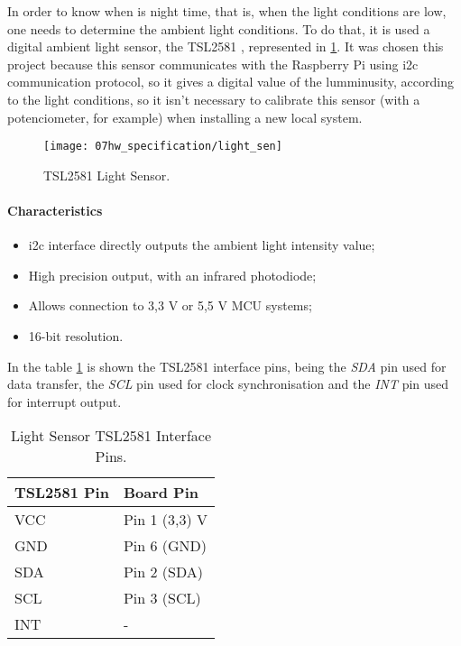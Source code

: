 In order to know when is night time, that is, when the light conditions are low, one needs to determine the ambient light conditions. To do that, it is used a digital ambient light sensor, the TSL2581 \cite{light_sensor}, represented in \ref{fig:light_sen}. It was chosen this project because this sensor communicates with the Raspberry Pi using \ac{i2c} communication protocol, so it gives a digital value of the lumminusity, according to the light conditions, so it isn't necessary to calibrate this sensor (with a potenciometer, for example) when installing a new local system.

\begin{figure}[ht]
	\centering
	\texttt{[image: 07hw\_specification/light\_sen]}
	\caption{TSL2581 Light Sensor.}
	\label{fig:light_sen}
\end{figure}

\paragraph*{Characteristics}
\begin{itemize}
	\item \ac{i2c} interface directly outputs the ambient light intensity value;
	\item High precision output, with an infrared photodiode;
	\item Allows connection to 3,3 V or 5,5 V MCU systems;
	\item 16-bit resolution.
\end{itemize}

In the table \ref{table:light_sen} is shown the TSL2581 interface pins, being the \textit{SDA} pin used for data transfer, the \textit{SCL} pin used for clock synchronisation and the \textit{INT} pin used for interrupt output. 

\begin{table}[H]
	\centering
	\begin{tabular}{|m{5cm}|m{6cm}|}
		\hline
		\textbf{TSL2581 Pin} & \textbf{Board Pin}\\\hline\hline
		VCC & Pin 1 (3,3) V\\\hline
		GND & Pin 6 (GND)\\\hline
		SDA & Pin 2 (SDA)\\\hline
		SCL & Pin 3 (SCL)\\\hline
		INT & -\\
		\hline
	\end{tabular}		
	
	\caption{Light Sensor TSL2581 Interface Pins.}
	\label{table:light_sen}
\end{table}


